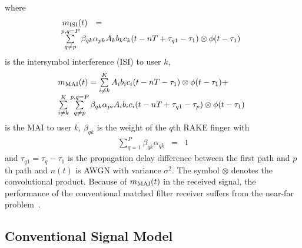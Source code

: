 \documentclass[conference]{IEEEtran}
\begin{document}
where
\begin{equation} \hspace{-0.05in}
\begin{array}{rcl}
 m_{\rm ISI}(t)&=&\\
 &&\hspace{-0.83in}\sum\limits^{p,q=P}_{q\neq
p}\beta_{qk} \alpha_{pk}A_kb_kc_k(t-nT+\tau_{q1}-\tau_1)\otimes
\phi(t-\tau_1)
\end{array}
\end{equation}
is the intersymbol interference (ISI) to user $k$,
\begin{equation} \hspace{-0.05in}
\begin{array}{l}
m_{\rm MAI}(t)=\sum\limits_{i\neq
 k}^{K}A_ib_ic_i(t-nT-\tau_1)\otimes\phi(t-\tau_1)+\\
 \hspace{.0in}\sum\limits_{i\neq
 k}^{K}\sum\limits^{p,q=P}_{q\neq
p}\beta_{qk}
\alpha_{pi}A_ib_ic_i(t-nT+\tau_{q1}-\tau_p)\otimes\phi(t-\tau_1)
\end{array}
\end{equation}
\noindent is the MAI to user $k$, $\beta_{qk}$ is the weight of
the $q$th RAKE finger with
\begin{equation}
\begin{array}{rcl}
\sum\limits_{q=1}^{P}\beta_{qk}\alpha_{qk}&=&1
\end{array}
\end{equation}
and $\tau_{q1} = \tau_{q}-\tau_1$ is the propagation
delay difference between the first path and $p$th path and
$n(t)$ is AWGN with variance $\sigma^2$.  The symbol $\otimes$
denotes the convolutional product.  Because of $m_{\rm MAI}(t)$ in the received
signal, the performance of the conventional matched filter
receiver suffers from the  near-far problem~\cite{Verd98}.

\subsection{Conventional Signal Model}
\end{document}
